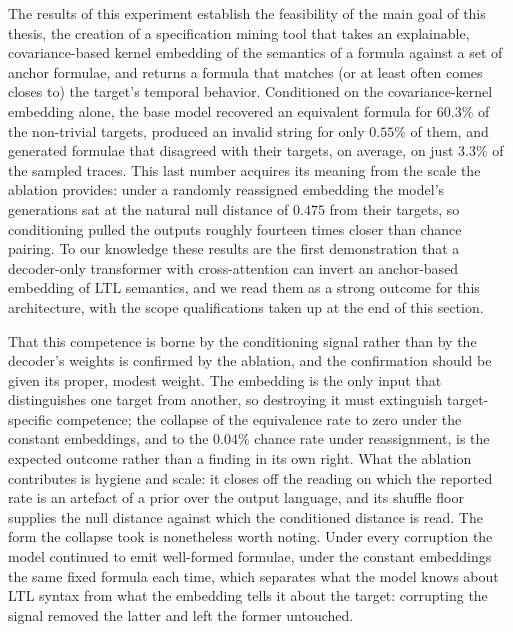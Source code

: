 \documentclass[titlepage,a4paper,11pt]{report}
\begin{document}
    The results of this experiment establish the feasibility of the main goal of this thesis, the creation of a specification mining tool that takes an explainable, covariance-based kernel embedding of the semantics of a formula against a set of anchor formulae, and returns a formula that matches (or at least often comes closes to) the target's temporal behavior. Conditioned on the covariance-kernel embedding alone, the base model recovered an equivalent formula for $60.3\%$ of the non-trivial targets, produced an invalid string for only $0.55\%$ of them, and generated formulae that disagreed with their targets, on average, on just $3.3\%$ of the sampled traces. This last number acquires its meaning from the scale the ablation provides: under a randomly reassigned embedding the model's generations sat at the natural null distance of $0.475$ from their targets, so conditioning pulled the outputs roughly fourteen times closer than chance pairing. To our knowledge these results are the first demonstration that a decoder-only transformer with cross-attention can invert an anchor-based embedding of LTL semantics, and we read them as a strong outcome for this architecture, with the scope qualifications taken up at the end of this section.

    That this competence is borne by the conditioning signal rather than by the decoder's weights is confirmed by the ablation, and the confirmation should be given its proper, modest weight. The embedding is the only input that distinguishes one target from another, so destroying it must extinguish target-specific competence; the collapse of the equivalence rate to zero under the constant embeddings, and to the $0.04\%$ chance rate under reassignment, is the expected outcome rather than a finding in its own right. What the ablation contributes is hygiene and scale: it closes off the reading on which the reported rate is an artefact of a prior over the output language, and its shuffle floor supplies the null distance against which the conditioned distance is read. The form the collapse took is nonetheless worth noting. Under every corruption the model continued to emit well-formed formulae, under the constant embeddings the same fixed formula each time, which separates what the model knows about LTL syntax from what the embedding tells it about the target: corrupting the signal removed the latter and left the former untouched.
    
\end{document}
